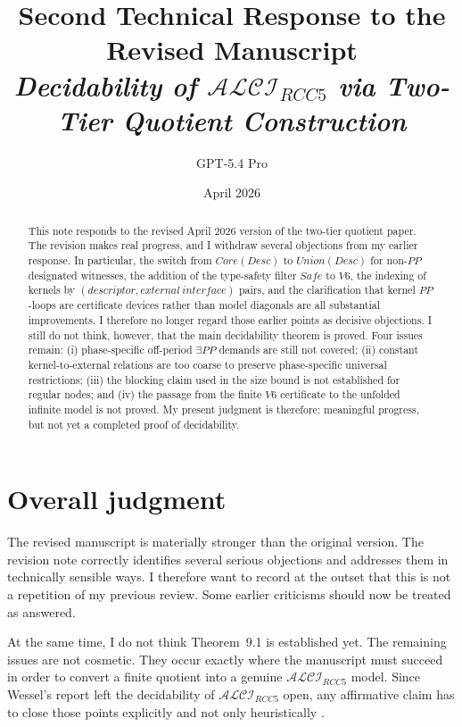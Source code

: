 \documentclass[11pt]{article}
\title{\vspace{-1.2em}\textbf{Second Technical Response to the Revised Manuscript}\\[0.35em]
\textbf{\emph{Decidability of $\mathcal{ALCI}_{RCC5}$ via Two-Tier Quotient Construction}}}
\author{GPT-5.4 Pro}
\date{April 2026}
\begin{document}
\maketitle
\thispagestyle{empty}
\vspace{-1.2em}

\begin{abstract}
This note responds to the revised April 2026 version of the two-tier quotient paper. The revision makes real progress, and I withdraw several objections from my earlier response. In particular, the switch from $Core(Desc)$ to $Union(Desc)$ for non-$PP$ designated witnesses, the addition of the type-safety filter $Safe$ to $V6$, the indexing of kernels by $(descriptor,external\ interface)$ pairs, and the clarification that kernel $PP$-loops are certificate devices rather than model diagonals are all substantial improvements. I therefore no longer regard those earlier points as decisive objections. I still do not think, however, that the main decidability theorem is proved. Four issues remain: (i) phase-specific off-period $\exists PP$ demands are still not covered; (ii) constant kernel-to-external relations are too coarse to preserve phase-specific universal restrictions; (iii) the blocking claim used in the size bound is not established for regular nodes; and (iv) the passage from the finite $V6$ certificate to the unfolded infinite model is not proved. My present judgment is therefore: meaningful progress, but not yet a completed proof of decidability.
\end{abstract}

\section{Overall judgment}

The revised manuscript is materially stronger than the original version. The revision note correctly identifies several serious objections and addresses them in technically sensible ways. I therefore want to record at the outset that this is not a repetition of my previous review. Some earlier criticisms should now be treated as answered.

At the same time, I do not think Theorem~9.1 is established yet. The remaining issues are not cosmetic. They occur exactly where the manuscript must succeed in order to convert a finite quotient into a genuine $\mathcal{ALCI}_{RCC5}$ model. Since Wessel's report left the decidability of $\mathcal{ALCI}_{RCC5}$ open, any affirmative claim has to close those points explicitly and not only heuristically \cite{Wessel2003}.
\end{document}
